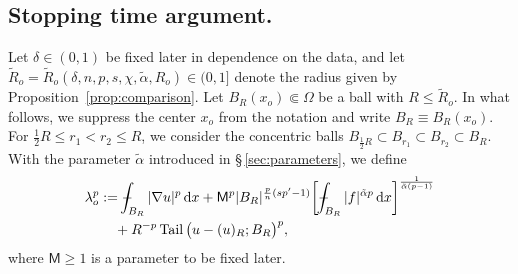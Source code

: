 \documentclass[10pt,letterpaper]{amsart}
\theoremstyle{definition}
\numberwithin{theorem}{section}
\numberwithin{equation}{section}
\newcommand{\1}{\ensuremath{\mathds{1}}}
\newcommand{\dx}{\mathrm{d}x}
\def\Xint#1{\mathchoice
    {\XXint\displaystyle\textstyle{#1}}%
    {\XXint\textstyle\scriptstyle{#1}}%
    {\XXint\scriptstyle\scriptscriptstyle{#1}}%
    {\XXint\scriptscriptstyle\scriptscriptstyle{#1}}%
    \!\int}
\def\XXint#1#2#3{\setbox0=\hbox{$#1{#2#3}{\int}$}
    \vcenter{\hbox{$#2#3$}}\kern-0.5\wd0}
\def\bint{\Xint-}
\DeclareMathOperator{\Tail}{Tail}
\numberwithin{equation}{section}
\begin{document}
\subsection{Stopping time argument.}
Let $\delta\in(0,1)$ be fixed later in dependence on the data, and let 
$\widetilde R_o=\widetilde R_o(\delta,n,p,s,\chi,\tilde\alpha,R_o)\in(0,1]$ 
denote the radius given by Proposition~\ref{prop:comparison}. 
Let $B_R(x_o)\Subset\Omega$ be a ball with $R\le \widetilde R_o$.
In what follows, we suppress the center $x_o$ from the notation and write
$B_R\equiv B_R(x_o)$.
For \(\frac12 R\le r_1< r_2\le R\), we consider the concentric balls
\(
    B_{\frac12R}\subset B_{r_1}\subset B_{r_2}\subset B_R .
\)
With the parameter $\tilde\alpha$ introduced in \S\,\ref{sec:parameters}, we define
\begin{align}\label{def:lambda_0}\nonumber
    \lambda_o^p
    &:=
    \bint_{B_R} |\nabla u|^p \,\dx
    + \mathsf M^p
    |B_R|^{\frac{p}{n}(sp'- 1)}
    \bigg[
        \bint_{B_R} |f|^{\tilde\alpha p} \,\dx
    \bigg]^{\frac{1}{\tilde\alpha(p-1)}}\\
    &\phantom{:=}
    + R^{-p} \Tail\big(u-(u)_R;B_R\big)^p ,
\end{align}
where \(\mathsf M\ge1\) is a parameter to be fixed later. 
\end{document}
